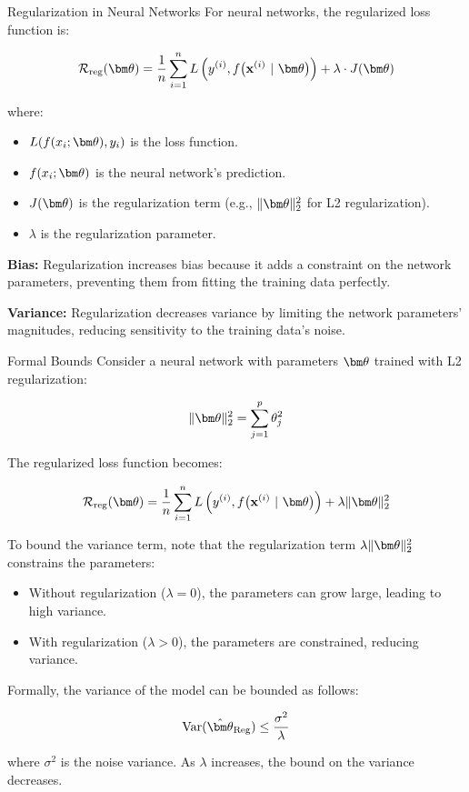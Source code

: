 \documentclass[11pt,compress,t,notes=noshow, xcolor=table]{beamer}
\begin{document}
\begin{vbframe}{Regularization in Neural Networks}
For neural networks, the regularized loss function is:

\[
\riskrt = \frac{1}{n} \sum_{i=1}^{n} \Lxyit + \lambda \cdot J(\thetav)
\]

where:

\begin{itemize}
    \item \( L(f(x_i; \thetav), y_i) \) is the loss function.
    \item \( f(x_i; \thetav) \) is the neural network's prediction.
    \item \( J(\thetav) \) is the regularization term (e.g., \( \|\thetav\|_2^2 \) for L2 regularization).
    \item \( \lambda \) is the regularization parameter.
\end{itemize}

\textbf{Bias:}
Regularization increases bias because it adds a constraint on the network parameters, preventing them from fitting the training data perfectly.

\textbf{Variance:}
Regularization decreases variance by limiting the network parameters' magnitudes, reducing sensitivity to the training data's noise.

\end{vbframe}

\begin{vbframe}{Formal Bounds}
Consider a neural network with parameters \(\thetav\) trained with L2 regularization:

\[
\|\thetav\|_2^2 = \sum_{j=1}^{p} \theta_j^2
\]

The regularized loss function becomes:

\[
\riskrt = \frac{1}{n} \sum_{i=1}^{n} \Lxyit + \lambda \|\thetav\|_2^2
\]

To bound the variance term, note that the regularization term \( \lambda \|\thetav\|_2^2 \) constrains the parameters:

\begin{itemize}
    \item Without regularization (\(\lambda = 0\)), the parameters can grow large, leading to high variance.
    \item With regularization (\(\lambda > 0\)), the parameters are constrained, reducing variance.
\end{itemize}

Formally, the variance of the model can be bounded as follows:

\[
\text{Var}(\hat{\thetav}_{\text{Reg}}) \leq \frac{\sigma^2}{\lambda}
\]

where \(\sigma^2\) is the noise variance. As \(\lambda\) increases, the bound on the variance decreases.
\end{vbframe}
\end{document}
